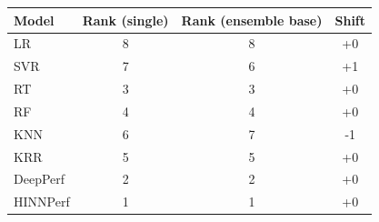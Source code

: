\begin{tabular}{lccc}
\toprule
Model & Rank (single) & Rank (ensemble base) & Shift \\
\midrule
LR & 8 & 8 & +0 \\
SVR & 7 & 6 & +1 \\
RT & 3 & 3 & +0 \\
RF & 4 & 4 & +0 \\
KNN & 6 & 7 & -1 \\
KRR & 5 & 5 & +0 \\
DeepPerf & 2 & 2 & +0 \\
HINNPerf & 1 & 1 & +0 \\
\bottomrule
\end{tabular}
